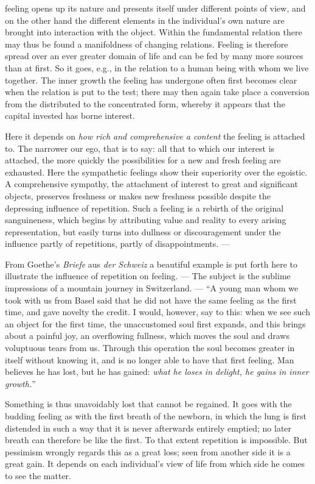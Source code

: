 \documentclass[12pt,a4paper,openany]{book}
\newcommand{\opage}[1]{\marginnote{\footnotesize\textit{[#1]}}}
\begin{document}
feeling opens up its nature and presents itself under different points of view, and on
the other hand the different elements in the individual's own nature are brought into
interaction with the object. Within the fundamental relation there may thus be found a
manifoldness of changing relations. Feeling is therefore spread over an ever greater
domain of life and can be fed by many more sources than at first. So it goes, e.g., in
the relation to a human being with whom we live together. The inner growth the feeling has
undergone often first becomes clear when the relation is put to the test; there may then
again take place a conversion from the distributed to the concentrated form, whereby it
appears that the capital invested has borne interest.

Here it depends on \textit{how rich and comprehensive a content} the feeling is attached
to. The narrower our ego, that is to say: all that to which our interest is attached, the
more quickly the possibilities for a new and fresh feeling are exhausted. Here the
sympathetic feelings show their superiority over the egoistic. A comprehensive sympathy,
the attachment of interest to great and significant objects, preserves freshness or makes
new freshness possible despite the depressing influence of repetition. Such a feeling is
a rebirth of the original sanguineness, which begins by attributing value and reality to
every arising representation, but easily turns into dullness or discouragement under the
influence partly of repetitions, partly of disappointments. ---

From Goethe's \textit{Briefe} aus \textit{der Schweiz} a beautiful example is put forth
here to illustrate the influence of repetition on feeling. --- The subject is the sublime
impressions of a mountain journey in Switzerland. --- ``A young man whom we took with us
from Basel said that he did not have the same feeling as the first time, and gave novelty
the credit. I would, however,
\setcounter{footnote}{0}%
\opage{235}say to this: when we see such an object for the first time, the unaccustomed soul
first expands, and this brings about a painful joy, an overflowing fullness, which moves
the soul and draws voluptuous tears from us. Through this operation the soul becomes
greater in itself without knowing it, and is no longer able to have that first feeling.
Man believes he has lost, but he has gained: \textit{what he loses in delight, he gains
in inner growth.}''

Something is thus unavoidably lost that cannot be regained. It goes with the budding
feeling as with the first breath of the newborn, in which the lung is first distended in
such a way that it is never afterwards entirely emptied; no later breath can therefore be
like the first. To that extent repetition is impossible. But pessimism wrongly regards
this as a great loss; seen from another side it is a great gain. It depends on each
individual's view of life from which side he comes to see the matter.
\end{document}
